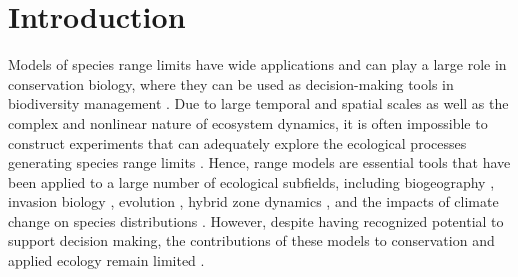 \section*{Introduction}

Models of species range limits have wide applications and can play a large role in conservation biology, where they can be used as decision-making tools in biodiversity management \citep{Guisan2013}.
Due to large temporal and spatial scales as well as the complex and nonlinear nature of ecosystem dynamics, it is often impossible to construct experiments that can adequately explore the ecological processes generating species range limits \citep{Wu1995, Levin1998}. 
Hence, range models are essential tools that have been applied to a large number of ecological subfields, including biogeography \citep{Schurr2012}, invasion biology \citep{Catterall2012, Gallien2012}, evolution \citep{Jay2012}, hybrid zone dynamics \citep{Engler2013}, and the impacts of climate change on species distributions \citep{Thuiller2011, Blois2013, Thuiller2014}. 
However, despite having recognized potential to support decision making, the contributions of these models to conservation and applied ecology remain limited \citep{Guisan2013}.

